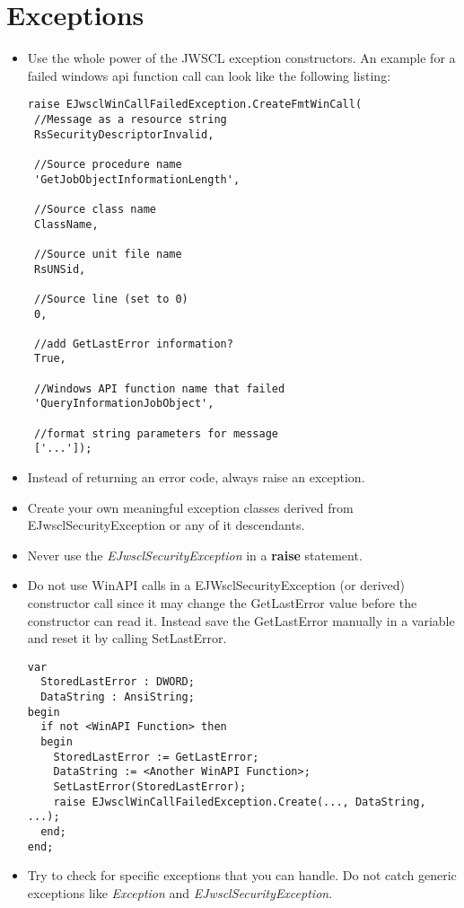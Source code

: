 \documentclass[a4paper,oneside,10pt]{article}
\begin{document}
\section{Exceptions}

\begin{itemize}
	\item Use the whole power of the JWSCL exception constructors. An example for a failed windows api function call can look like the following listing:
\begin{lstlisting}
raise EJwsclWinCallFailedException.CreateFmtWinCall(
 //Message as a resource string
 RsSecurityDescriptorInvalid,          
 
 //Source procedure name
 'GetJobObjectInformationLength',      
 
 //Source class name
 ClassName,                            
 
 //Source unit file name
 RsUNSid,                              
 
 //Source line (set to 0)
 0,                                    
 
 //add GetLastError information?
 True,                                 
 
 //Windows API function name that failed
 'QueryInformationJobObject',          
 
 //format string parameters for message
 ['...']);
\end{lstlisting}            
  \item Instead of returning an error code, always raise an exception.
  \item Create your own meaningful exception classes derived from EJwsclSecurityException or any of it descendants.
  \item Never use the \textit{EJwsclSecurityException} in a \textbf{raise} statement.
  \item Do not use WinAPI calls in a EJWsclSecurityException (or derived) constructor call since it may change the GetLastError value before the constructor can read it. Instead save the GetLastError manually in a variable and reset it by calling SetLastError.
\begin{lstlisting}  
var 
  StoredLastError : DWORD;
  DataString : AnsiString;
begin
  if not <WinAPI Function> then
  begin
    StoredLastError := GetLastError;
    DataString := <Another WinAPI Function>;
    SetLastError(StoredLastError);
    raise EJwsclWinCallFailedException.Create(..., DataString, ...);
  end;
end;
\end{lstlisting}

  \item Try to check for specific exceptions that you can handle. Do not catch generic
exceptions like \textit{Exception} and \textit{EJwsclSecurityException}.

\end{itemize}
\end{document}
